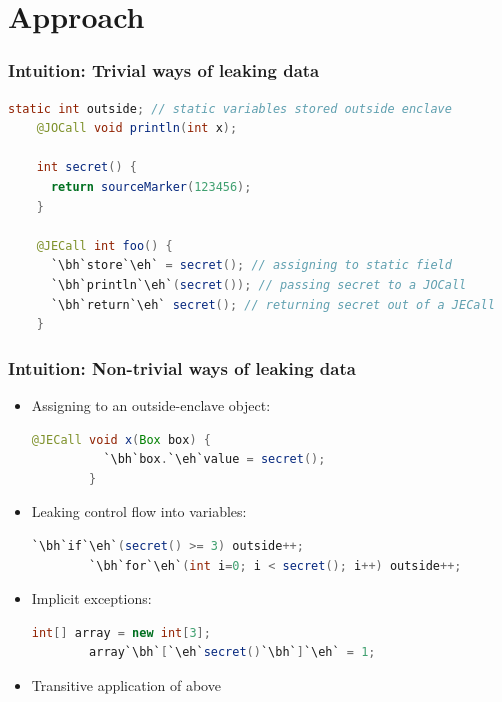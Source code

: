 \documentclass{beamer}
\newcounter{highlight}[page]
\newcommand{\tikzhighlightanchor}[1]{\ensuremath{\vcenter{\hbox{\tikz[remember picture, overlay]{\coordinate (#1 highlight \arabic{highlight});}}}}}
\newcommand{\bh}[0]{\stepcounter{highlight}\tikzhighlightanchor{begin}}
\newcommand{\eh}[0]{\tikzhighlightanchor{end}}
\begin{document}
\section{Approach}
\begin{frame}[fragile]
  \frametitle{Intuition: Trivial ways of leaking data}
  \begin{lstlisting}[language=java, style=j]
    static int outside; // static variables stored outside enclave
    @JOCall void println(int x);

    int secret() {
      return sourceMarker(123456);
    }

    @JECall int foo() {
      `\bh`store`\eh` = secret(); // assigning to static field
      `\bh`println`\eh`(secret()); // passing secret to a JOCall
      `\bh`return`\eh` secret(); // returning secret out of a JECall
    }
  \end{lstlisting}
\end{frame}

\begin{frame}[fragile]
  \frametitle{Intuition: Non-trivial ways of leaking data}
  \begin{itemize}
    \item Assigning to an outside-enclave object:
      \begin{lstlisting}[language=java, style=j, gobble=8, tabsize=2]
        @JECall void x(Box box) {
          `\bh`box.`\eh`value = secret();
        }
      \end{lstlisting}
    \item Leaking control flow into variables:
      \begin{lstlisting}[language=java, style=j, gobble=8, tabsize=2]
        `\bh`if`\eh`(secret() >= 3) outside++;
        `\bh`for`\eh`(int i=0; i < secret(); i++) outside++;
      \end{lstlisting}
    \item Implicit exceptions:\\
      \begin{lstlisting}[language=java, style=j, gobble=8, tabsize=2]
        int[] array = new int[3];
        array`\bh`[`\eh`secret()`\bh`]`\eh` = 1;
      \end{lstlisting}
    \item Transitive application of above
  \end{itemize}
\end{frame}
\end{document}
